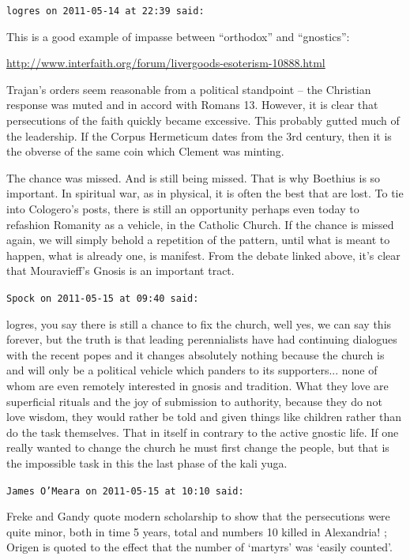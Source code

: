 \begin{footnotesize}
\begin{sffamily}
\texttt{logres on 2011-05-14 at 22:39 said:}

This is a good example of impasse between ``orthodox'' and ``gnostics'':

\url{http://www.interfaith.org/forum/livergoods-esoterism-10888.html}

Trajan's orders seem reasonable from a political standpoint -- the Christian response was muted and in accord with Romans 13. However, it is clear that persecutions of the faith quickly became excessive. This probably gutted much of the leadership. If the Corpus Hermeticum dates from the 3rd century, then it is the obverse of the same coin which Clement was minting.

The chance was missed. And is still being missed. That is why Boethius is so important. In spiritual war, as in physical, it is often the best that are lost. To tie into Cologero's posts, there is still an opportunity perhaps even today to refashion Romanity as a vehicle, in the Catholic Church. If the chance is missed again, we will simply behold a repetition of the pattern, until what is meant to happen, what is already one, is manifest. From the debate linked above, it's clear that Mouravieff's Gnosis is an important tract.

\hfill

\texttt{Spock on 2011-05-15 at 09:40 said:}

logres, you say there is still a chance to fix the church, well yes, we can say this forever, but the truth is that leading perennialists have had continuing dialogues with the recent popes and it changes absolutely nothing because the church is and will only be a political vehicle which panders to its supporters... none of whom are even remotely interested in gnosis and tradition. What they love are superficial rituals and the joy of submission to authority, because they do not love wisdom, they would rather be told and given things like children rather than do the task themselves. That in itself in contrary to the active gnostic life. If one really wanted to change the church he must first change the people, but that is the impossible task in this the last phase of the kali yuga.

\hfill

\texttt{James O'Meara on 2011-05-15 at 10:10 said:}

Freke and Gandy quote modern scholarship to show that the persecutions were quite minor, both in time 5 years, total and numbers 10 killed in Alexandria! ; Origen is quoted to the effect that the number of `martyrs' was `easily counted'.


\end{sffamily}
\end{footnotesize}
